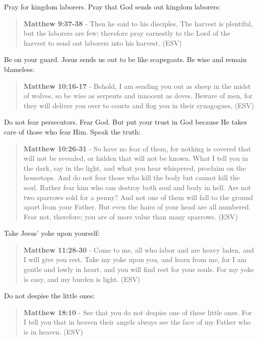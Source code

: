 \documentclass[11pt]{article}
\begin{document}
Pray for kingdom laborers. Pray that God sends out kingdom laborers:

\begin{quote}
\textbf{Matthew 9:37-38} - Then he said to his disciples, The harvest is plentiful, but the laborers are few; therefore pray earnestly to the Lord of the harvest to send out laborers into his harvest. (ESV)
\end{quote}

Be on your guard. Jesus sends us out to be like scapegoats. Be wise and remain blameless:

\begin{quote}
\textbf{Matthew 10:16-17} - Behold, I am sending you out as sheep in the midst of wolves, so be wise as serpents and innocent as doves. Beware of men, for they will deliver you over to courts and flog you in their synagogues, (ESV)
\end{quote}

Do not fear persecutors. Fear God. But put your trust in God because He takes care of those who fear Him. Speak the truth:

\begin{quote}
\textbf{Matthew 10:26-31} - So have no fear of them, for nothing is covered that will not be revealed, or hidden that will not be known. What I tell you in the dark, say in the light, and what you hear whispered, proclaim on the housetops. And do not fear those who kill the body but cannot kill the soul. Rather fear him who can destroy both soul and body in hell. Are not two sparrows sold for a penny? And not one of them will fall to the ground apart from your Father. But even the hairs of your head are all numbered. Fear not, therefore; you are of more value than many sparrows. (ESV)
\end{quote}

Take Jesus' yoke upon yourself:

\begin{quote}
\textbf{Matthew 11:28-30} - Come to me, all who labor and are heavy laden, and I will give you rest. Take my yoke upon you, and learn from me, for I am gentle and lowly in heart, and you will find rest for your souls. For my yoke is easy, and my burden is light. (ESV)
\end{quote}

Do not despise the little ones:

\begin{quote}
\textbf{Matthew 18:10} - See that you do not despise one of these little ones. For I tell you that in heaven their angels always see the face of my Father who is in heaven. (ESV)
\end{quote}
\end{document}
